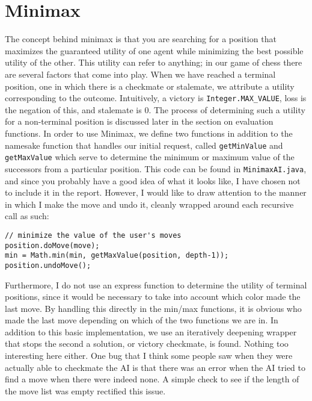 \documentclass[11pt, oneside]{article}%
\begin{document}
\section{Minimax}
The concept behind minimax is that you are searching for a position that maximizes the guaranteed utility of one agent while minimizing the best possible utility of the other.  This utility can refer to anything; in our game of chess there are several factors that come into play.  When we have reached a terminal position, one in which there is a checkmate or stalemate, we attribute a utility corresponding to the outcome.  Intuitively, a victory is \verb`Integer.MAX_VALUE`, loss is the negation of this, and stalemate is 0.  The process of determining such a utility for a non-terminal position is discussed later in the section on evaluation functions.  In order to use Minimax, we define two functions in addition to the namesake function that handles our initial request, called \verb`getMinValue` and \verb`getMaxValue` which serve to determine the minimum or maximum value of the successors from a particular position.  This code can be found in \verb`MinimaxAI.java`, and since you probably have a good idea of what it looks like, I have chosen not to include it in the report.  However, I would like to draw attention to the manner in which I make the move and undo it, cleanly wrapped around each recursive call as such:

\begin{lstlisting}
// minimize the value of the user's moves
position.doMove(move);
min = Math.min(min, getMaxValue(position, depth-1));
position.undoMove();
\end{lstlisting}

Furthermore, I do not use an express function to determine the utility of terminal positions, since it would be necessary to take into account which color made the last move.  By handling this directly in the min/max functions, it is obvious who made the last move depending on which of the two functions we are in.  In addition to this basic implementation, we use an iteratively deepening wrapper that stops the second a solution, or victory checkmate, is found.  Nothing too interesting here either.  One bug that I think some people saw when they were actually able to checkmate the AI is that there was an error when the AI tried to find a move when there were indeed none.  A simple check to see if the length of the move list was empty rectified this issue.
\end{document}
